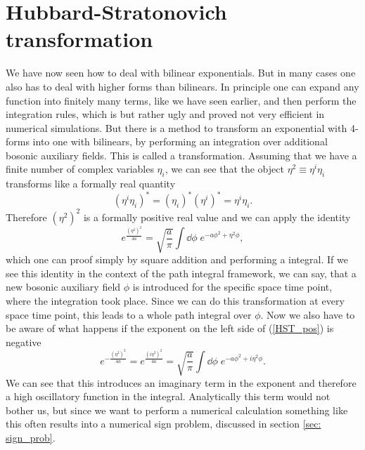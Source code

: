 \section{Hubbard-Stratonovich transformation} \label{sec: HS_trafo}
We have now seen how to deal with bilinear exponentials. But in many cases one also has to deal with higher forms than bilinears. In principle one can expand any function into finitely many terms, like we have seen earlier, and then perform the integration rules, which is but rather ugly and proved not very efficient in numerical simulations. But there is a method to transform an exponential with 4-forms into one with bilinears, by performing an integration over additional bosonic auxiliary fields. This is called a  transformation. Assuming that we have a finite number of complex  variables $\eta_{i}$, we can see that the object $\eta^{2}\equiv \eta^{i}\eta_{i}$ transforms like a formally real quantity
\begin{equation}
\left(\eta^{i}\eta_{i}\right)^{\ast}=\left(\eta_{i}\right)^{\ast}\left(\eta^{i}\right)^{\ast} =\eta^{i}\eta_{i}.
\end{equation}
Therefore $\left(\eta^{2}\right)^{2}$ is a formally positive real value and we can apply the identity
\begin{equation}
e ^{\frac{(\eta^{2})^{2}}{4a}}=\sqrt{\frac{a}{\pi}} \int\dd\phi\;e ^{-a\phi^{2}+\eta^{2}\phi},
\label{HST_pos}
\end{equation}
which one can proof simply by square addition and performing a  integral. If we see this identity in the context of the path integral  framework, we can say, that a new bosonic auxiliary field $\phi$ is introduced for the specific space time point, where the integration took place. Since we can do this transformation at every space time point, this leads to a whole path integral  over $\phi$. Now we also have to be aware of what happens if the exponent on the left side of (\ref{HST_pos}) is negative
\begin{equation}
e ^{-\frac{(\eta^{2})^{2}}{4a}}=e ^{\frac{(i\eta^{2})^{2}}{4a}}=\sqrt{\frac{a}{\pi}} \int\dd\phi\; e ^{-a\phi^{2}+i\eta^{2}\phi}.
\end{equation}
We can see that this introduces an imaginary term in the exponent and therefore a high oscillatory function in the integral. Analytically this term would not bother us, but since we want to perform a numerical calculation something like this often results into a numerical sign problem, discussed in section \ref{sec: sign_prob}.
